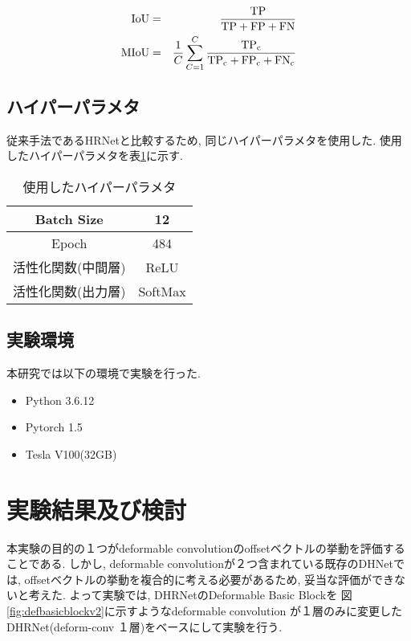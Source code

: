 \begin{eqnarray}
  \rm{IoU} &=& \frac{\rm{TP}}{\rm{TP} + \rm{FP} + \rm{FN}}\label{eq:iou}\\
  \rm{MIoU} &=& \frac{1}{C} \sum_{C=1}^C \frac{\rm{TP}_c}{\rm{TP}_c + \rm{FP}_c + \rm{FN}_c}\label{eq:miou}
\end{eqnarray}

\subsection{ハイパーパラメタ}\label{sub:hypara}
従来手法であるHRNet\cite{hrnet}と比較するため, 同じハイパーパラメタを使用した. 使用したハイパーパラメタを表\ref{tab:hypara}に示す. 
\begin{table}[H]
  \centering
  \caption{使用したハイパーパラメタ}
  \begin{tabular}{c|c} \hline \hline
     Batch Size & 12 \\ \hline 
     Epoch & 484  \\ \hline
     活性化関数(中間層) & ReLU \\ \hline
     活性化関数(出力層) & SoftMax\\ \hline \hline
  \end{tabular}
  \label{tab:hypara}
\end{table}

\subsection{実験環境}
本研究では以下の環境で実験を行った.
\begin{itemize}
\item Python 3.6.12
\item Pytorch 1.5
\item Tesla V100(32GB)
\end{itemize}


\section{実験結果及び検討}
本実験の目的の１つがdeformable convolutionのoffsetベクトルの挙動を評価することである. しかし, deformable convolutionが２つ含まれている既存のDHNetでは, offsetベクトルの挙動を複合的に考える必要があるため, 妥当な評価ができないと考えた. 
よって実験では, DHRNetのDeformable Basic Blockを 図\ref{fig:defbasicblockv2}に示すようなdeformable convolution が１層のみに変更したDHRNet(deform-conv １層)をベースにして実験を行う. 

